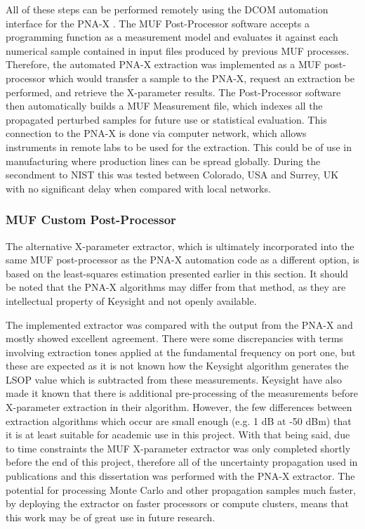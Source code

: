 \documentclass[../thesis/thesis.tex]{subfiles}
\begin{document}
All of these steps can be performed remotely using the DCOM automation interface for the PNA-X \cite{DCOM}. The MUF Post-Processor software accepts a programming function as a measurement model and evaluates it against each numerical sample contained in input files produced by previous MUF processes. Therefore, the automated PNA-X extraction was implemented as a MUF post-processor which would transfer a sample to the PNA-X, request an extraction be performed, and retrieve the X-parameter results. The Post-Processor software then automatically builds a MUF Measurement file, which indexes all the propagated perturbed samples for future use or statistical evaluation. This connection to the PNA-X is done via computer network, which allows instruments in remote labs to be used for the extraction. This could be of use in manufacturing where production lines can be spread globally. During the secondment to NIST this was tested between Colorado, USA and Surrey, UK with no significant delay when compared with local networks.

\subsubsection{MUF Custom Post-Processor}

The alternative X-parameter extractor, which is ultimately incorporated into the same MUF post-processor as the PNA-X automation code as a different option, is based on the least-squares estimation presented earlier in this section. It should be noted that the PNA-X algorithms may differ from that method, as they are intellectual property of Keysight and not openly available.

The implemented extractor was compared with the output from the PNA-X and mostly showed excellent agreement. There were some discrepancies with terms involving extraction tones applied at the fundamental frequency on port one, but these are expected as it is not known how the Keysight algorithm generates the LSOP value which is subtracted from these measurements. Keysight have also made it known that there is additional pre-processing of the measurements before X-parameter extraction in their algorithm. However, the few differences between extraction algorithms which occur are small enough (e.g. 1 dB at -50 dBm) that it is at least suitable for academic use in this project. With that being said, due to time constraints the MUF X-parameter extractor was only completed shortly before the end of this project, therefore all of the uncertainty propagation used in publications and this dissertation was performed with the PNA-X extractor. The potential for processing Monte Carlo and other propagation samples much faster, by deploying the extractor on faster processors or compute clusters, means that this work may be of great use in future research.
\end{document}

